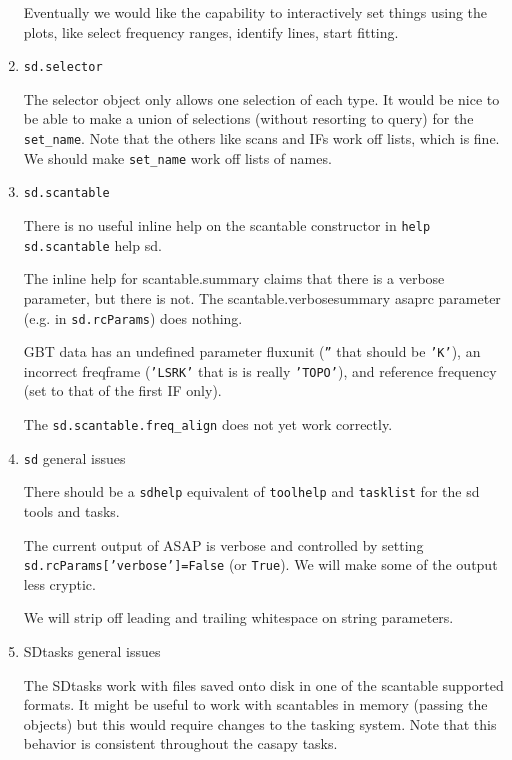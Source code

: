 \begin{enumerate}
  Eventually we would like the capability to interactively set things
  using the plots, like select frequency ranges, identify lines,
  start fitting.

\item {\tt sd.selector}

  The selector object only allows one selection of each type.  It would be 
  nice to be able to make a union of selections (without resorting to query)
  for the {\tt set\_name}.  Note that the others like scans and IFs work off
  lists, which is fine.  We should make {\tt set\_name} work off lists of names.

\item {\tt sd.scantable}

  There is no useful inline help on the scantable constructor
 in {\tt help sd.scantable} {help sd}.

  The inline help for scantable.summary claims that there is
  a verbose parameter, but there is not.  The scantable.verbosesummary
  asaprc parameter (e.g. in {\tt sd.rcParams}) does nothing.

  GBT data has an undefined parameter fluxunit ({\tt ''} that should be {\tt 'K'}), an 
  incorrect freqframe ({\tt 'LSRK'} that is is really {\tt 'TOPO'}), and reference
  frequency (set to that of the first IF only).


  The {\tt sd.scantable.freq\_align} does not yet work correctly.


\item {\tt sd} general issues

  There should be a {\tt sdhelp} equivalent of {\tt toolhelp}
  and {\tt tasklist} for the sd tools and tasks.

  The current output of ASAP is verbose and controlled by
  setting {\tt sd.rcParams['verbose']=False} (or {\tt True}).
  We will make some of the output less cryptic.

  We will strip off leading and trailing whitespace on string parameters.

\item SDtasks general issues

  The SDtasks work with files saved onto disk in one of the 
  scantable supported formats.  It might be useful to
  work with scantables in memory (passing the objects) but this
  would require changes to the tasking system.  Note that this
  behavior is consistent throughout the casapy tasks.



\end{enumerate}
